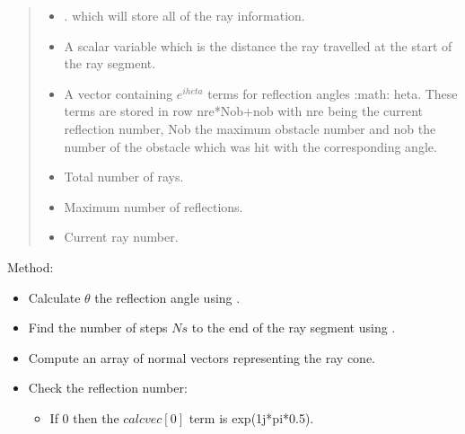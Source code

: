 \documentclass[letterpaper,10pt,english]{sphinxmanual}
\begin{document}
\begin{fulllineitems}
\begin{fulllineitems}
\begin{quote}
\begin{description}
\begin{itemize}
\item {} 
 \textendash{} {\hyperref[\detokenize{index:module-DictionarySparseMatrix}]{}}.      which will store all of the ray information.

\item {} 
 \textendash{} A scalar variable which is the distance the ray     travelled at the start of the ray segment.

\item {} 
 \textendash{} A vector containing \(e^{i     heta}\) terms     for reflection angles :math:\textasciigrave{}  heta\textasciigrave{}. These terms are stored     in row nre*Nob+nob with nre being the current reflection number,     Nob the maximum obstacle number and nob the number of the     obstacle which was hit with the corresponding angle.

\item {} 
 \textendash{} Total number of rays.

\item {} 
 \textendash{} Maximum number of reflections.

\item {} 
 \textendash{} Current ray number.

\end{itemize}

\end{description}\end{quote}

Method:
\begin{itemize}
\item {} 
Calculate \(\theta\) the reflection angle using     .

\item {} 
Find the number of steps \(Ns\) to the end of the ray segment     using .

\item {} 
Compute an array of normal vectors representing the ray cone.

\item {} 
Check the reflection number:
\begin{itemize}
\item {} 
If 0 then the \(calcvec[0]\) term is exp(1j*pi*0.5).


\end{itemize}
\end{itemize}
\end{fulllineitems}
\end{fulllineitems}
\end{document}
